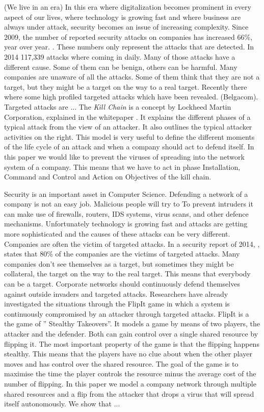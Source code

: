 (We live in an era) In this era where digitalization becomes prominent in every aspect of our lives, where technology is growing fast and where business are always under attack, security becomes an issue of increasing complexity. Since 2009, the number of reported security attacks on companies has increased 66\%, year over year. . These numbers only represent the attacks that are detected. In 2014 117,339 attacks where coming in daily. Many of those attacks have a different cause. Some of them can be benign, others can be harmful. Many companies are unaware of all the attacks. Some of them think that they are not a target, but they might be a target on the way to a real target. Recently there where some high profiled targeted attacks which have been revealed. (Belgacom). 
Targeted attacks are ...
The \textit{Kill Chain} is a concept by Lockheed Martin Corporation, explained in the whitepaper . It explains the different phases of a typical attack from the view of an attacker. It also outlines the typical attacker activities on the right. This model is very useful to define the different moments of the life cycle of an attack and when a company should act to defend itself. In this paper we would like to prevent the viruses of spreading into the network system of a company. This means that we have to act in phase Installation, Command and Control and Action on Objectives of the kill chain. 

 
  Security is an important asset in Computer Science. Defending a network of a company is not an easy job. Malicious people will try to  To prevent intruders it can make use of firewalls, routers, IDS systems, virus scans, and other defence mechanisms. Unfortunately technology is growing fast and attacks are getting more sophisticated and the causes of these attacks can be very different.  Companies are often the victim of targeted attacks. In a security report of 2014, , states that 80\% of the companies are the victims of targeted attacks. Many companies don't see themselves as a target, but sometimes they might be collateral, the target on the way to the real target. This means that everybody can be a target. 
Corporate networks should continuously defend themselves against outside invaders and targeted attacks. Researchers have already investigated the situations through the FlipIt game in which a system is continuously compromised by an attacker through targeted attacks. 
FlipIt is a the game of '' Stealthy Takeovers''. It models a game by means of two players, the attacker and the defender. Both can gain control over a single shared resource by flipping it. The most important property of the game is that the flipping happens stealthy. This means that the players have no clue about when the other player moves and has control over the shared resource. The goal of the game is to maximise the time the player controls the resource minus the average cost of the number of flipping.
In this paper we model a company network through multiple shared resources and a flip from the attacker that drops a virus that will spread itself autonomously. We show that ...

